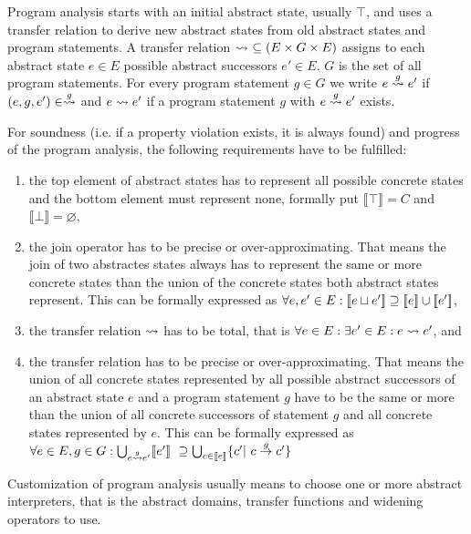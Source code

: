 Program analysis starts with an initial abstract state, usually $\top$, and uses a transfer relation to derive new abstract states from old abstract states and program statements.
A transfer relation \cite{Beyer2007} $\rightsquigarrow\ \subseteq (E \times G \times E)$ assigns to each abstract state $e \in E$ possible abstract successors $e' \in E$. $G$ is the set of all program statements.
For every program statement $g \in G$ we write $e \overset{g}{\rightsquigarrow} e'$ if $(e, g, e') \in \overset{g}{\rightsquigarrow}$ and $e \rightsquigarrow e'$ if a program statement $g$ with $e \overset{g}{\rightsquigarrow} e'$ exists.

For soundness (i.e. if a property violation exists, it is always found) and progress of the program analysis, the following requirements have to be fulfilled:\cite{Beyer2007}
\begin{enumerate}[label=\alph*)]
\item the top element of abstract states has to represent all possible concrete states and the bottom element must represent none, formally put $\llbracket \top \rrbracket = C$ and $\llbracket \bot \rrbracket = \varnothing$,
\item the join operator has to be precise or over-approximating. That means the join of two abstractes states always has to represent the same or more concrete states than the union of the concrete states both abstract states represent. This can be formally expressed as $\forall e, e' \in E: [\![ e \sqcup e' ]\!] \supseteq [\![ e ]\!] \cup [\![ e' ]\!]$,
\item the transfer relation $\rightsquigarrow$ has to be total, that is $\forall e \in E: \exists e' \in E: e \rightsquigarrow e'$, and
\item the transfer relation has to be precise or over-approximating. That means the union of all concrete states represented by all possible abstract successors of an abstract state $e$ and a program statement $g$ have to be the same or more than the union of all concrete successors of statement $g$ and all concrete states represented by $e$.
This can be formally expressed as $\forall e \in E, g \in G: \bigcup_{e \gtransfer e'} \llbracket e' \rrbracket\ \supseteq \bigcup_{c \in \llbracket e \rrbracket} \{ c' |\ c \overset{g}{\rightarrow} c' \}$
\end{enumerate}
Customization of program analysis usually means to choose one or more abstract interpreters, that is the abstract domains, transfer functions and widening operators to use.\cite{Beyer2007}

